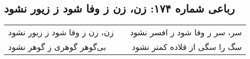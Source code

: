 \begin{center}
\section*{رباعی شماره ۱۷۴: زن، زن ز وفا شود ز زیور نشود}
\label{sec:sh174}
\begin{longtable}{l p{0.5cm} r}
زن، زن ز وفا شود ز زیور نشود
&&
سر، سر ز وفا شود ز افسر نشود
\\
بی‌گوهر گوهری ز گوهر نشود
&&
سگ را سگی از قلاده کمتر نشود
\\
\end{longtable}
\end{center}
